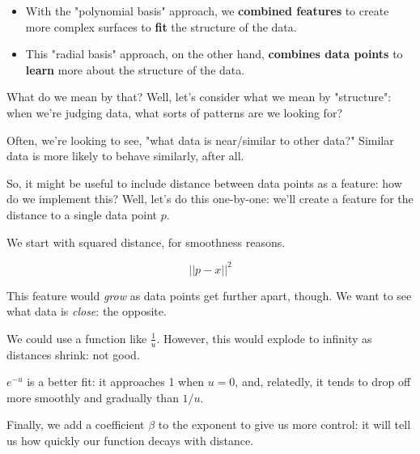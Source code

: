             \begin{itemize}
                \item With the "polynomial basis" approach, we \textbf{combined features} to create more complex surfaces to \textbf{fit} the structure of the data.
                
                \item This "radial basis" approach, on the other hand, \textbf{combines data points} to \textbf{learn} more about the structure of the data.
            \end{itemize}

            What do we mean by that? Well, let's consider what we mean by "structure": when we're judging data, what sorts of patterns are we looking for?

            Often, we're looking to see, "what data is near/similar to other data?" Similar data is more likely to behave similarly, after all.

            So, it might be useful to include distance between data points as a feature: how do we implement this? Well, let's do this one-by-one: we'll create a feature for the distance to a single data point $p$.
            
            We start with squared distance, for smoothness reasons.

            \begin{equation}
                ||p-x||^2
            \end{equation}

            This feature would \textit{grow} as data points get further apart, though. We want to see what data is \textit{close}: the opposite.

            We could use a function like $\frac{1}{u}$. However, this would explode to infinity as distances shrink: not good.

            $e^{-u}$ is a better fit: it approaches 1 when $u=0$, and, relatedly, it tends to drop off more smoothly and gradually than $1/u$. 

            Finally, we add a coefficient $\beta$ to the exponent to give us more control: it will tell us how quickly our function decays with distance.
                \\

